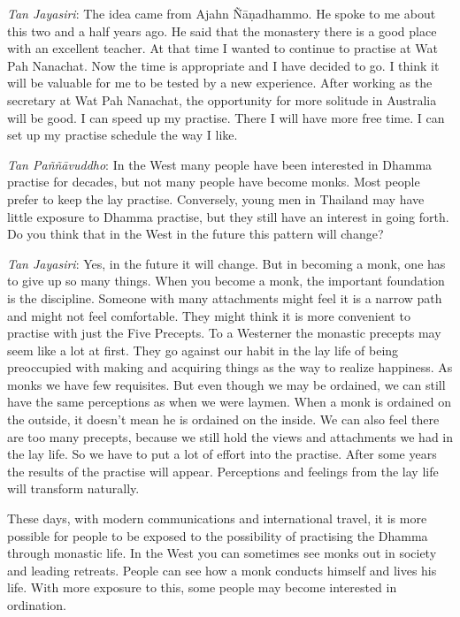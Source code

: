 \emph{Tan Jayasiri}: The idea came from Ajahn Ñāṇadhammo. He spoke to me
about this two and a half years ago. He said that the monastery there is
a good place with an excellent teacher. At that time I wanted to
continue to practise at Wat Pah Nanachat. Now the time is appropriate
and I have decided to go. I think it will be valuable for me to be
tested by a new experience. After working as the secretary at Wat Pah
Nanachat, the opportunity for more solitude in Australia will be good. I
can speed up my practise. There I will have more free time. I can set up
my practise schedule the way I like. 

\emph{Tan Paññāvuddho}: In the West many people have been interested in
Dhamma practise for decades, but not many people have become monks. Most
people prefer to keep the lay practise. Conversely, young men in
Thailand may have little exposure to Dhamma practise, but they still
have an interest in going forth. Do you think that in the West in the
future this pattern will change? 

\emph{Tan Jayasiri}: Yes, in the future it will change. But in becoming
a monk, one has to give up so many things. When you become a monk, the
important foundation is the discipline. Someone with many attachments
might feel it is a narrow path and might not feel comfortable. They
might think it is more convenient to practise with just the Five
Precepts. To a Westerner the monastic precepts may seem like a lot at
first. They go against our habit in the lay life of being preoccupied
with making and acquiring things as the way to realize happiness. As
monks we have few requisites. But even though we may be ordained, we can
still have the same perceptions as when we were laymen. When a monk is
ordained on the outside, it doesn't mean he is ordained on the inside. 
We can also feel there are too many precepts, because we still hold the
views and attachments we had in the lay life. So we have to put a lot of
effort into the practise. After some years the results of the practise
will appear. Perceptions and feelings from the lay life will transform
naturally. 

These days, with modern communications and international travel, it is
more possible for people to be exposed to the possibility of practising
the Dhamma through monastic life. In the West you can sometimes see
monks out in society and leading retreats. People can see how a monk
conducts himself and lives his life. With more exposure to this, some
people may become interested in ordination. 

